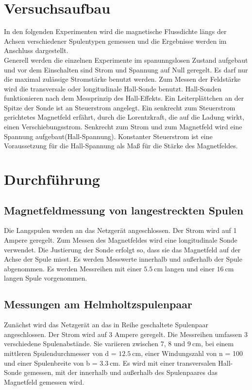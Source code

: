 \section{Versuchsaufbau}
In den folgenden Experimenten wird die magnetische Flussdichte längs der Achsen verschiedener Spulentypen gemessen und die Ergebnisse werden im Anschluss dargestellt. \\
Generell werden die einzelnen Experimente im spanunngslosen Zustand aufgebaut und vor dem Einschalten sind Strom und Spannung auf Null geregelt.
Es darf nur die maximal zulässige Stromstärke benutzt werden. Zum Messen der Feldstärke wird die transversale oder longitudinale Hall-Sonde benutzt.
Hall-Sonden funktionieren nach dem Messprinzip des Hall-Effekts. Ein Leiterplättchen an der Spitze der Sonde ist an Steuerstrom angelegt.
Ein senkrecht zum Steuerstrom gerichtetes Magnetfeld erfährt, durch die Lorentzkraft, die auf die Ladung wirkt, einen Verschiebungsstrom.
Senkrecht zum Strom und zum Magnetfeld wird eine Spannung aufgebaut(Hall-Spannung). Konstanter Steuerstrom ist eine Voraussetzung für die Hall-Spannung als Maß für die Stärke des Magnetfeldes.

\section{Durchführung}
\subsection{Magnetfeldmessung von langestreckten Spulen}
Die Langspulen werden an das Netzgerät angeschlossen.
Der Strom wird auf 1 Ampere geregelt. Zum Messen des Magnetfeldes wird eine longitudinale Sonde verwendet.
Die Justierung der Sonde erfolgt so, dass sie das Magnetfeld auf der Achse der Spule misst.
Es werden Messwerte innerhalb und außerhalb der Spule abgenommen.
Es werden Messreihen mit einer $\SI{5.5}{\centi\metre}$ langen und einer $\SI{16}{\centi\metre}$ langen Spule vorgenommen.

\subsection{Messungen am Helmholtzspulenpaar}

Zunächst wird das Netzgerät an das in Reihe geschaltete Spulenpaar angeschlossen. Der Strom wird auf 3 Ampere geregelt.
Die Messreihen umfassen 3 verschiedene Spulenabstände.
Sie variieren zwischen 7, 8 und $\SI{9}{\centi\metre}$, bei einem mittleren Spulendurchmesser von d = $\SI{12.5}{\centi\metre}$, einer Windungszahl von n = 100 und einer Spulenbreite von b = $\SI{3.3}{\centi\metre}$.
Es wird mit einer transversalen Hall-Sonde gemessen, mit der innerhalb und außerhalb des Spulenpaares das Magnetfeld gemessen wird.

